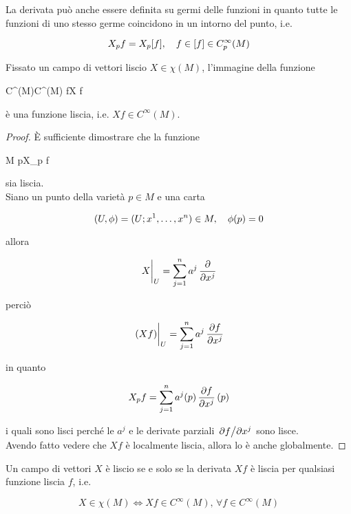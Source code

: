 La derivata può anche essere definita su germi delle funzioni in quanto tutte le funzioni di uno stesso germe coincidono in un intorno del punto, i.e.

\begin{equation}
	X_{p} f = X_{p} [f] \qcomma f \in [f] \in C_{p}^{\infty}(M)
\end{equation}

\begin{definition}
	Fissato un campo di vettori liscio $ X \in \chi(M) $, l'immagine della funzione
	
		{C^{\infty}(M)}{C^{\infty}(M)}
		{f}{X f}

	è una funzione liscia, i.e. $ X f \in C^{\infty}(M) $.
\end{definition}

\begin{proof}
	È sufficiente dimostrare che la funzione
	
		{M}{\R}
		{p}{X_{p} f}

	sia liscia.\\
	Siano un punto della varietà $ p \in M $ e una carta
	
	\begin{equation}
		(U,\phi) = (U; x^{1},\dots,x^{n}) \in M \qcomma \phi(p) = 0
	\end{equation}
	
	allora
	
	\begin{equation}
		\eval{X}_{U} = \sum_{j=1}^{n} a^{j} \, \pdv{x^{j}}
	\end{equation}

	perciò
	
	\begin{equation}
		\eval{(X f)}_{U} = \sum_{j=1}^{n} a^{j} \, \pdv{f}{x^{j}}
	\end{equation}

	in quanto
	
	\begin{equation}
		X_{p} f = \sum_{j=1}^{n} a^{j}(p) \, \pdv{f}{x^{j}} \, (p)
	\end{equation}

	i quali sono lisci perché le $ a^{j} $ e le derivate parziali $ \pdv*{f}{x^{j}} $ sono lisce.\\
	Avendo fatto vedere che $ X f $ è localmente liscia, allora lo è anche globalmente.
\end{proof}

\begin{definition}
	Un campo di vettori $ X $ è liscio se e solo se la derivata $ X f $ è liscia per qualsiasi funzione liscia $ f $, i.e.
	
	\begin{equation}
		X \in \chi(M) \iff X f \in C^{\infty}(M), \, \forall f \in C^{\infty}(M)
	\end{equation}
\end{definition}

